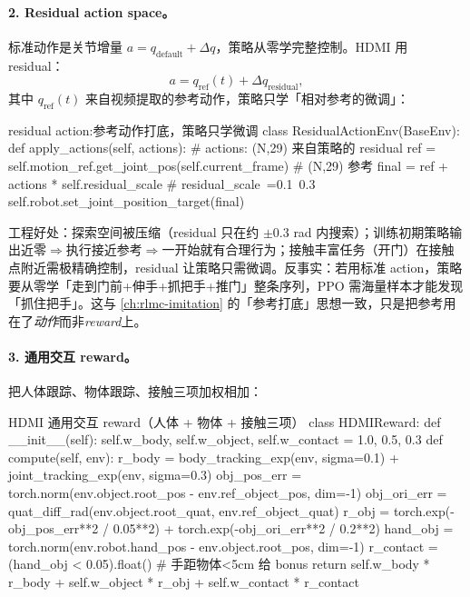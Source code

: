 \paragraph{2. Residual action space。}标准动作是关节增量 $a = q_{\text{default}} + \Delta q$，策略从零学完整控制。HDMI 用 residual：
\begin{equation}
a = q_{\text{ref}}(t) + \Delta q_{\text{residual}},
\label{eq:rlmc-mm-hdmi-residual}
\end{equation}
其中 $q_{\text{ref}}(t)$ 来自视频提取的参考动作，策略只学「相对参考的微调」：

\begin{codebox}[Python]{residual action:参考动作打底，策略只学微调}
class ResidualActionEnv(BaseEnv):
    def apply_actions(self, actions):       # actions: (N,29) 来自策略的 residual
        ref = self.motion_ref.get_joint_pos(self.current_frame)   # (N,29) 参考
        final = ref + actions * self.residual_scale   # residual_scale~=0.1~0.3
        self.robot.set_joint_position_target(final)
\end{codebox}

工程好处：探索空间被压缩（residual 只在约 $\pm0.3$ rad 内搜索）；训练初期策略输出近零$\Rightarrow$执行接近参考$\Rightarrow$一开始就有合理行为；接触丰富任务（开门）在接触点附近需极精确控制，residual 让策略只需微调。反事实：若用标准 action，策略要从零学「走到门前+伸手+抓把手+推门」整条序列，PPO 需海量样本才能发现「抓住把手」。这与 \cref{ch:rlmc-imitation} 的「参考打底」思想一致，只是把参考用在了\emph{动作}而非\emph{reward}上。

\paragraph{3. 通用交互 reward。}把人体跟踪、物体跟踪、接触三项加权相加：

\begin{codebox}[Python]{HDMI 通用交互 reward（人体 + 物体 + 接触三项）}
class HDMIReward:
    def __init__(self):
        self.w_body, self.w_object, self.w_contact = 1.0, 0.5, 0.3
    def compute(self, env):
        r_body = body_tracking_exp(env, sigma=0.1) + joint_tracking_exp(env, sigma=0.3)
        obj_pos_err = torch.norm(env.object.root_pos - env.ref_object_pos, dim=-1)
        obj_ori_err = quat_diff_rad(env.object.root_quat, env.ref_object_quat)
        r_obj = torch.exp(-obj_pos_err**2 / 0.05**2) + torch.exp(-obj_ori_err**2 / 0.2**2)
        hand_obj = torch.norm(env.robot.hand_pos - env.object.root_pos, dim=-1)
        r_contact = (hand_obj < 0.05).float()        # 手距物体<5cm 给 bonus
        return self.w_body * r_body + self.w_object * r_obj + self.w_contact * r_contact
\end{codebox}

